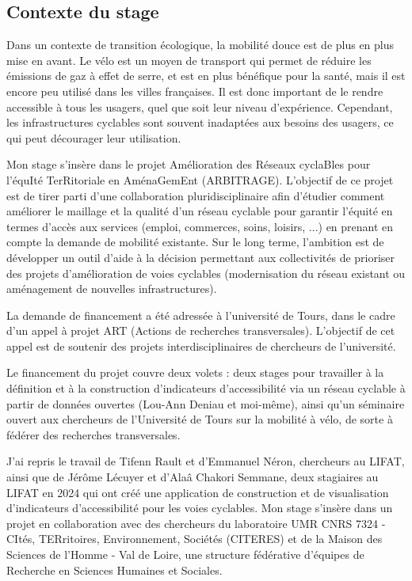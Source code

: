 \subsection{Contexte du stage}

Dans un contexte de transition écologique, la mobilité douce est de plus en plus mise en avant. Le vélo est un moyen de transport qui permet de réduire les émissions de gaz à effet de serre, et est en plus bénéfique pour la santé, mais il est encore peu utilisé dans les villes françaises. Il est donc important de le rendre accessible à tous les usagers, quel que soit leur niveau d'expérience. Cependant, les infrastructures cyclables sont souvent inadaptées aux besoins des usagers, ce qui peut décourager leur utilisation.

Mon stage s'insère dans le projet Amélioration des Réseaux cyclaBles pour l'équIté TerRitoriale en AménaGemEnt (ARBITRAGE). L'objectif de ce projet est de tirer parti d'une collaboration pluridisciplinaire afin d'étudier comment améliorer le maillage et la qualité d'un réseau cyclable pour garantir l'équité en termes d'accès aux services (emploi, commerces, soins, loisirs, ...) en prenant en compte la demande de mobilité existante. Sur le long terme, l'ambition est de développer un outil d'aide à la décision permettant aux collectivités de prioriser des projets d'amélioration de voies cyclables (modernisation du réseau existant ou aménagement de nouvelles infrastructures). 

La demande de financement a été adressée à l'université de Tours, dans le cadre d'un appel à projet ART (Actions de recherches transversales). L'objectif de cet appel est de soutenir des projets interdisciplinaires de chercheurs de l'université.

Le financement du projet couvre deux volets : deux stages pour travailler à la définition et à la construction d'indicateurs d'accessibilité via un réseau cyclable à partir de données ouvertes (Lou-Ann Deniau et moi-même), ainsi qu'un séminaire ouvert aux chercheurs de l'Université de Tours sur la mobilité à vélo, de sorte à fédérer des recherches transversales.

J'ai repris le travail de Tifenn Rault et d'Emmanuel Néron, chercheurs au LIFAT, ainsi que de Jérôme Lécuyer et d'Alaâ Chakori Semmane, deux stagiaires au LIFAT en 2024 qui ont créé une application de construction et de visualisation d'indicateurs d'accessibilité pour les voies cyclables. Mon stage s'insère dans un projet en collaboration avec des chercheurs du laboratoire UMR CNRS 7324 - CItés, TERritoires, Environnement, Sociétés (CITERES) et de la Maison des Sciences de l'Homme - Val de Loire, une structure fédérative d'équipes de Recherche en Sciences Humaines et Sociales. 

